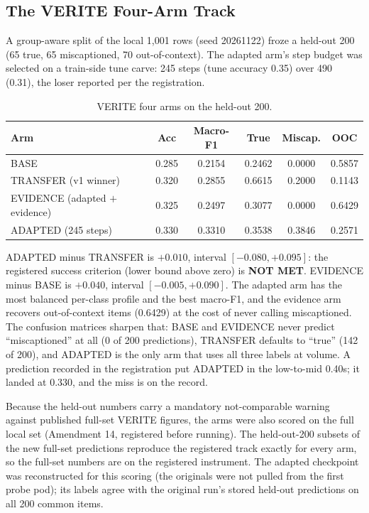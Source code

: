 \documentclass{article} %
\begin{document}
\subsection{The VERITE Four-Arm Track}
A group-aware split of the local 1,001 rows (seed 20261122) froze a held-out 200 (65 true, 65 miscaptioned, 70 out-of-context). The adapted arm's step budget was selected on a train-side tune carve: 245 steps (tune accuracy 0.35) over 490 (0.31), the loser reported per the registration.

\begin{table}[t]
\centering
\small
\caption{VERITE four arms on the held-out 200.}
\label{tab:verite4}
\begin{tabular}{lccccc}
\toprule
Arm & Acc & Macro-F1 & True & Miscap. & OOC \\
\midrule
BASE & 0.285 & 0.2154 & 0.2462 & 0.0000 & 0.5857 \\
TRANSFER (v1 winner) & 0.320 & 0.2855 & 0.6615 & 0.2000 & 0.1143 \\
EVIDENCE (adapted \(+\) evidence) & 0.325 & 0.2497 & 0.3077 & 0.0000 & 0.6429 \\
ADAPTED (245 steps) & 0.330 & 0.3310 & 0.3538 & 0.3846 & 0.2571 \\
\bottomrule
\end{tabular}
\end{table}

ADAPTED minus TRANSFER is \(+0.010\), interval \([-0.080, +0.095]\): the registered success criterion (lower bound above zero) is \textbf{NOT MET}. EVIDENCE minus BASE is \(+0.040\), interval \([-0.005, +0.090]\). The adapted arm has the most balanced per-class profile and the best macro-F1, and the evidence arm recovers out-of-context items (0.6429) at the cost of never calling miscaptioned. The confusion matrices sharpen that: BASE and EVIDENCE never predict ``miscaptioned'' at all (0 of 200 predictions), TRANSFER defaults to ``true'' (142 of 200), and ADAPTED is the only arm that uses all three labels at volume. A prediction recorded in the registration put ADAPTED in the low-to-mid 0.40s; it landed at 0.330, and the miss is on the record.

Because the held-out numbers carry a mandatory not-comparable warning against published full-set VERITE figures, the arms were also scored on the full local set (Amendment 14, registered before running). The held-out-200 subsets of the new full-set predictions reproduce the registered track exactly for every arm, so the full-set numbers are on the registered instrument. The adapted checkpoint was reconstructed for this scoring (the originals were not pulled from the first probe pod); its labels agree with the original run's stored held-out predictions on all 200 common items.
\end{document}
